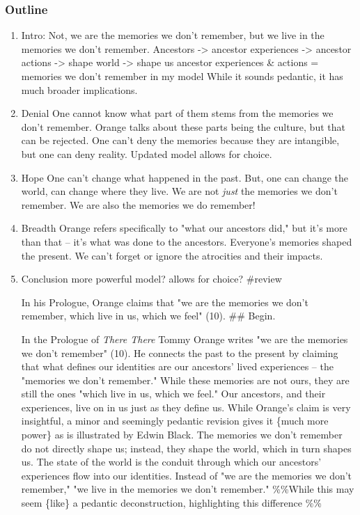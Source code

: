 \documentclass[letterpaper]{article}
\begin{document}
\subsubsection{Outline}
\label{sec:orgd9429b2}
\begin{enumerate}
\item Intro:
\label{sec:orgc110d2e}
Not, we are the memories we don't remember, but we live in the memories
we don't remember. Ancestors -> ancestor experiences -> ancestor actions
-> shape world -> shape us ancestor experiences \& actions = memories we
don't remember in my model While it sounds pedantic, it has much broader
implications.

\item Denial
\label{sec:orgb27c1a7}
One cannot know what part of them stems from the memories we don't
remember. Orange talks about these parts being the culture, but that can
be rejected. One can't deny the memories because they are intangible,
but one can deny reality. Updated model allows for choice.

\item Hope
\label{sec:orgd006ded}
One can't change what happened in the past. But, one can change the
world, can change where they live. We are not \emph{just} the memories we
don't remember. We are also the memories we do remember!

\item Breadth
\label{sec:orge58c303}
Orange refers specifically to "what our ancestors did," but it's more
than that -- it's what was done to the ancestors. Everyone's memories
shaped the present. We can't forget or ignore the atrocities and their
impacts.

\item Conclusion
\label{sec:org9b317a1}
more powerful model? allows for choice? \#review

In his Prologue, Orange claims that "we are the memories we don't
remember, which live in us, which we feel" (10). \#\# Begin.

In the Prologue of \emph{There There} Tommy Orange writes "we are the
memories we don't remember" (10). He connects the past to the present by
claiming that what defines our identities are our ancestors' lived
experiences -- the "memories we don't remember." While these memories
are not ours, they are still the ones "which live in us, which we feel."
Our ancestors, and their experiences, live on in us just as they define
us. While Orange's claim is very insightful, a minor and seemingly
pedantic revision gives it \{much more power\} as is illustrated by Edwin
Black. The memories we don't remember do not directly shape us; instead,
they shape the world, which in turn shapes us. The state of the world is
the conduit through which our ancestors' experiences flow into our
identities. Instead of "we are the memories we don't remember," "we live
in the memories we don't remember." \%\%While this may seem \{like\} a
pedantic deconstruction, highlighting this difference \%\%


\end{enumerate}
\end{document}
